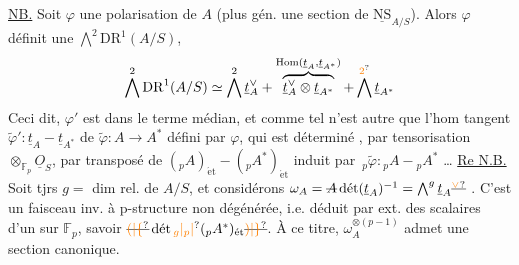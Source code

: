\uline{NB.} Soit $\varphi$ une polarisation de $A$ (plus
gén. une  section de $\underline{\mathrm{NS}}_{A/S}$). Alors
$\varphi$ définit une 
$\bigwedge^2\mathrm{DR}^1(A/S)$, 
\[
\bigwedge^{2}\mathrm{DR}^1(A/S)\simeq\bigwedge^2\underline t_A^\vee+
\overbrace{\underline t_A^\vee\otimes\underline t_{A^*}}^{\operatorname{Hom}(\underline t_A,\underline t_{A^*})}
+\bigwedge^{\unsure{2}}\underline t_{A^*}
\]
Ceci dit, $\varphi'$ est dans le terme médian, et
comme tel n'est autre que l'hom
tangent $\widetilde\varphi':\underline t_A\mathbin{-}\underline t_{A^*}$ de $\widetilde\varphi:A\to A^*$ défini
par $\varphi$, qui est déterminé , par tensorisation
 $\otimes_{\mathbb F_p}\underline O_S$, par
 transposé de
$({}_pA)_{\mathrm{\acute et}}\mathbin{-}({}_pA^*)_{\mathrm{\acute et}}$ induit par $\,{}_p\widetilde\varphi:{}_pA\mathbin{-}{}_pA^*$ \ldots
\uline{Re N.B.} Soit tjrs $g=$ dim rel. de $A/S$, et considérons
$\omega_A=\deleted{A}\operatorname{d\acute et}(\underline t_A)^{-1}
=\bigwedge^g\underline t_A\deleted{\unsure{{}^\vee}}$
.
C'est un faisceau inv.
à p-structure non dégénérée, i.e. déduit par
ext. des scalaires d'un 
  sur $\mathbb F_p$, savoir
$\deleted{\unsure{(|\{}}\operatorname{d\acute et}\unsure{{}_g|{}_p|{}}({}_pA^*)_{\mathrm{\acute et}}\deleted{\unsure{)|\}}}$.
À ce titre, $\omega_A^{\otimes(p-1)}$ admet une section canonique.

